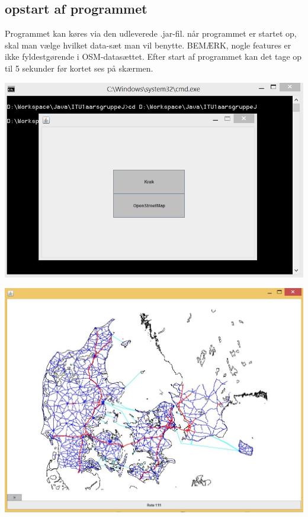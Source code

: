 \subsection{opstart af programmet}
Programmet kan køres via den udleverede .jar-fil. når programmet er startet op, skal man vælge hvilket data-sæt man vil benytte. BEMÆRK, nogle features er ikke fyldestgørende i OSM-datasættet.
Efter start af programmet kan det tage op til 5 sekunder før kortet ses på skærmen.

\begin{center}
\includegraphics[width=(\textwidth)/2]{brugervejledning/vaelgdata}
\end{center}

\begin{center}
\includegraphics[width=(\textwidth)/2]{brugervejledning/renkort}
\end{center}

